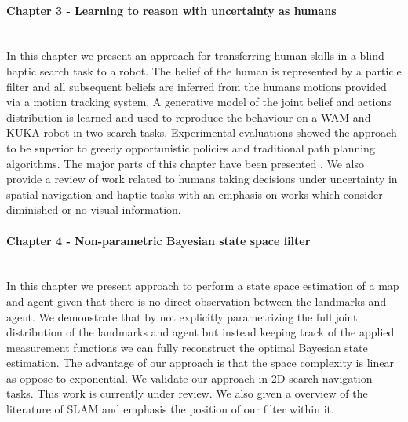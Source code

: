 \begin{minipage}[c]{0.9\textwidth}
\paragraph{Chapter 3 - Learning to reason with uncertainty as humans}\\
In this chapter we present an approach for transferring human skills in a blind haptic 
search task to a robot. The belief of the human is represented by a particle filter and 
all subsequent beliefs are inferred from the humans motions provided via a motion tracking
system. A generative model of the joint belief and actions distribution is learned and used
to reproduce the behaviour on a WAM and KUKA robot in two search tasks. Experimental 
evaluations showed the approach to be superior to greedy opportunistic policies and traditional
path planning algorithms. The major parts of this chapter have been presented \cite{Chambrier2014}.
We also provide a review of work related to humans taking decisions under uncertainty 
in spatial navigation and haptic tasks with an emphasis on works which consider diminished or no 
visual information. 
\end{minipage}


\begin{minipage}[c]{0.9\textwidth}
\paragraph{Chapter 4 - Non-parametric Bayesian state space filter}\\
In this chapter we present approach to perform a state space estimation of a map and agent 
given that there is no direct observation between the landmarks and agent. We demonstrate that 
by not explicitly parametrizing the full joint distribution of the landmarks and agent but instead
keeping track of the applied measurement functions we can fully reconstruct the optimal Bayesian 
state estimation. The advantage of our approach is that the space complexity is linear as oppose 
to exponential. We validate our approach in 2D search navigation tasks. This work is currently under review.
We also given a overview of the literature of SLAM and emphasis the position of our filter within it.
\end{minipage}

